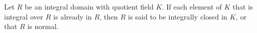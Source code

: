 Let $R$ be an integral domain with quotient field $K$. If each element of $K$ that is integral over $R$ is already in $R$, then $R$ is said to be integrally closed in $K$, or that $R$ is normal.
